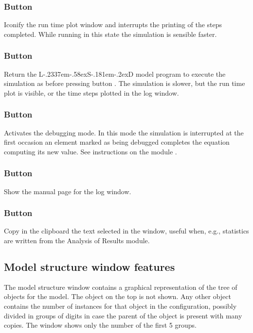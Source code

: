 \documentclass [11pt,a4paper] {book}
\def\LsD{{L\kern-.2337em\lower-.58ex\hbox{S}\kern-.181em\lower-.2ex\hbox{D}}\xspace}
\begin{document}
\subsubsection{Button }
Iconify the run time plot window and interrupts the printing of the steps completed. While running in this state the simulation is sensible faster.

\subsubsection{Button }
Return the \LsD model program to execute the simulation as before pressing button . The simulation is slower, but the run time plot is visible, or the time steps plotted in the log window.

\subsubsection{Button }

Activates the debugging mode. In this mode the simulation is interrupted at the first occasion an element marked as being debugged completes the equation computing its new value. See instructions on the module \menu{\LsD debugger}. 


\subsubsection{Button }
Show the manual page for the log window.

\subsubsection{Button }
Copy in the clipboard the text selected in the  window, useful when, e.g., statistics are written from the Analysis of Results module.

\subsection{Model structure window features}
The model structure window contains a graphical representation of the tree of objects for the model. The object  on the top is not shown. Any other object contains the number of instances for that object in the configuration, possibly divided in groups of digits in case the parent of the object is present with many copies. The window shows only the number of the first 5 groups.
\end{document}
